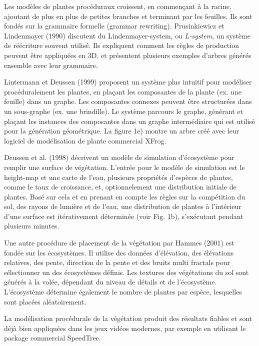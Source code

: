 \documentclass[11pt]{report}
\begin{document}
Les modèles de plantes procéduraux croissent, en commençant à la racine, ajoutant de plus en plus de petites branches et terminant par les feuilles. Ils sont fondés sur la grammaire formelle (grammar rewriting). Prusinkiewicz et Lindenmayer (1990) discutent du Lindenmayer-system, ou \textit{L-system}, un système de réécriture souvent utilisé. Ils expliquent comment les règles de production peuvent être appliquées en 3D, et présentent plusieurs exemples d'arbres générés ensemble avec leur grammaire. \newline

Lintermann et Deussen (1999) proposent un système plus intuitif  pour modéliser procéduralement les plantes, en plaçant les composantes de la plante (ex. une feuille) dans un graphe. Les composantes connexes peuvent être structurées dans un sous-graphe (ex. une brindille). Le système parcours le graphe, générant et plaçant les instances des composantes dans un graphe intermédiaire qui est utilisé pour la génération géométrique. La figure 1e) montre un arbre créé avec leur logiciel de modélisation de plante commercial XFrog.\newline

Deussen et al. (1998) décrivent un  modèle de simulation d'écosystème pour remplir une surface de végétation. L'entrée pour le modèle de simulation est le height-map et une carte de l'eau, plusieurs propriétés d'espèces de plantes, comme le taux de croissance, et, optionnelement une distribution initiale de plantes. Basé sur cela et en prenant en compte  les règles sur la compétition du sol, des rayons de lumière et de l'eau, une distribution de plantes à l'intérieur d'une surface est itérativement déterminée (voir Fig. 1b), s'exécutant pendant plusieurs minutes. \newline

Une autre procédure de placement de la végétation par Hammes (2001) est fondée sur les écosystèmes. Il utilise des données d'élévation, des élévations relatives, des pente, direction de la pente et des bruits multi fractals pour sélectionner un des écosystèmes définis. Les textures des végétations du sol sont générés à la volée, dépendant du niveau de détails et de l'écosystème. L'écosystème détermine également le nombre de plantes par espèce, lesquelles sont placées aléatoirement. \newline

La modélisation procédurale de la végétation produit des résultats fiables et sont déjà bien appliquées dans les jeux vidéos modernes, par exemple en utilisant le package commercial SpeedTree.
\end{document}
